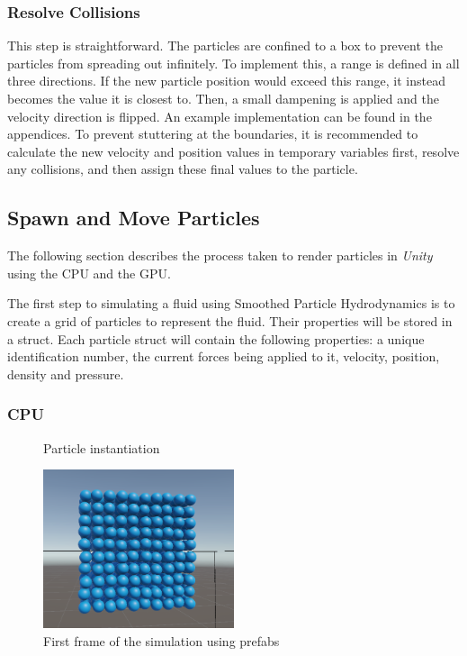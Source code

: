 \documentclass[a4paper, 12pt]{article}
\newcommand{\wideimage}[2][]{%
  \makebox[\textwidth][c]{\texttt{[image: \#2]}}%
}
\begin{document}
    \subsubsection{Resolve Collisions}

    This step is straightforward. The particles are confined to a box to prevent the particles from spreading out infinitely. To implement this, a range is defined in all three directions. If the new particle position would exceed this range, it instead becomes the value it is closest to. Then, a small dampening is applied and the velocity direction is flipped. An example implementation can be found in the appendices. To prevent stuttering at the boundaries, it is recommended to calculate the new velocity and position values in temporary variables first, resolve any collisions, and then assign these final values to the particle.

    \subsection{Spawn and Move Particles}

    The following section describes the process taken to render particles in \textit{Unity} using the CPU and the GPU.

    The first step to simulating a fluid using Smoothed Particle Hydrodynamics is to create a grid of particles to represent the fluid. Their properties will be stored in a struct. Each particle struct will contain the following properties: a unique identification number, the current forces being applied to it, velocity, position, density and pressure.

    \subsubsection{CPU}

    \begin{figure}[H]
        \wideimage[width=1.1\textwidth]{spawnParticles.png}
        \caption{Particle instantiation}
    \end{figure}

    \begin{figure}[H]
        \begin{center}
            \includegraphics[width=0.5\textwidth]{firstFrameCPU.png}
            \caption{First frame of the simulation using prefabs}
        \end{center}
    \end{figure}
\end{document}
